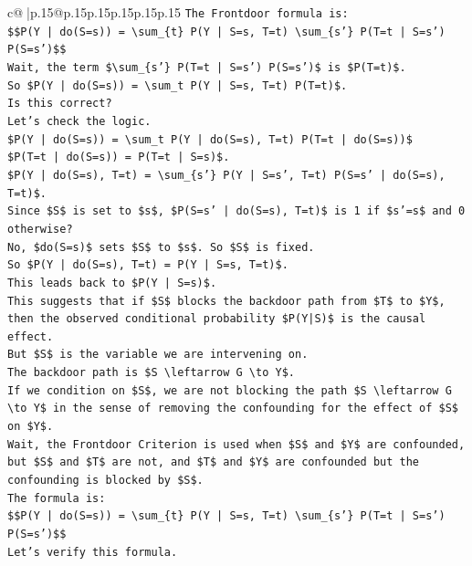 \documentclass{article}
\begin{document}
{\begin{supertabular}{c@{$\;$}|p{.15\linewidth}@{}p{.15\linewidth}p{.15\linewidth}p{.15\linewidth}p{.15\linewidth}p{.15\linewidth}}
{{{\texttt{The Frontdoor formula is:} \\
\texttt{\$\$P(Y | do(S=s)) = \textbackslash{}sum\_\{t\} P(Y | S=s, T=t) \textbackslash{}sum\_\{s'\} P(T=t | S=s') P(S=s')\$\$} \\
\texttt{Wait, the term \$\textbackslash{}sum\_\{s'\} P(T=t | S=s') P(S=s')\$ is \$P(T=t)\$.} \\
\texttt{So \$P(Y | do(S=s)) = \textbackslash{}sum\_t P(Y | S=s, T=t) P(T=t)\$.} \\
\texttt{Is this correct?} \\
\texttt{Let's check the logic.} \\
\texttt{\$P(Y | do(S=s)) = \textbackslash{}sum\_t P(Y | do(S=s), T=t) P(T=t | do(S=s))\$} \\
\texttt{\$P(T=t | do(S=s)) = P(T=t | S=s)\$.} \\
\texttt{\$P(Y | do(S=s), T=t) = \textbackslash{}sum\_\{s'\} P(Y | S=s', T=t) P(S=s' | do(S=s), T=t)\$.} \\
\texttt{Since \$S\$ is set to \$s\$, \$P(S=s' | do(S=s), T=t)\$ is 1 if \$s'=s\$ and 0 otherwise?} \\
\texttt{No, \$do(S=s)\$ sets \$S\$ to \$s\$. So \$S\$ is fixed.} \\
\texttt{So \$P(Y | do(S=s), T=t) = P(Y | S=s, T=t)\$.} \\
\texttt{This leads back to \$P(Y | S=s)\$.} \\
\texttt{This suggests that if \$S\$ blocks the backdoor path from \$T\$ to \$Y\$, then the observed conditional probability \$P(Y|S)\$ is the causal effect.} \\
\texttt{But \$S\$ is the variable we are intervening on.} \\
\texttt{The backdoor path is \$S \textbackslash{}leftarrow G \textbackslash{}to Y\$.} \\
\texttt{If we condition on \$S\$, we are not blocking the path \$S \textbackslash{}leftarrow G \textbackslash{}to Y\$ in the sense of removing the confounding for the effect of \$S\$ on \$Y\$.} \\
\texttt{Wait, the Frontdoor Criterion is used when \$S\$ and \$Y\$ are confounded, but \$S\$ and \$T\$ are not, and \$T\$ and \$Y\$ are confounded but the confounding is blocked by \$S\$.} \\
\texttt{The formula is:} \\
\texttt{\$\$P(Y | do(S=s)) = \textbackslash{}sum\_\{t\} P(Y | S=s, T=t) \textbackslash{}sum\_\{s'\} P(T=t | S=s') P(S=s')\$\$} \\
\texttt{Let's verify this formula.} \\
}}}
\end{supertabular}}
\end{document}
